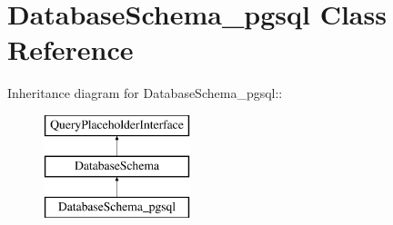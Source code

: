 \hypertarget{classDatabaseSchema__pgsql}{
\section{DatabaseSchema\_\-pgsql Class Reference}
\label{classDatabaseSchema__pgsql}
}
Inheritance diagram for DatabaseSchema\_\-pgsql::\begin{figure}[H]
\begin{center}
\leavevmode
\includegraphics[height=3cm]{classDatabaseSchema__pgsql}
\end{center}
\end{figure}
